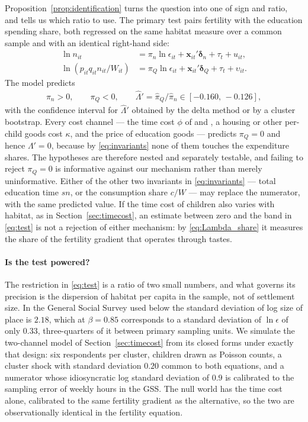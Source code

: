 \documentclass[11pt]{article}
\begin{document}
Proposition~\ref{prop:identification} turns the question into one of sign and ratio, and tells us
which ratio to use. The primary test pairs fertility with the education spending share, both
regressed on the same habitat measure over a common sample and with an identical right-hand side:
\begin{align}
\ln n_{it} &= \pi_n \ln \epsilon_{it} + \mathbf{x}_{it}'\boldsymbol{\delta}_n+\tau_t+u_{it},
\label{eq:pair_n}\\
\ln\!\left(p_{it}q_{it}n_{it}/W_{it}\right) &= \pi_{Q}\ln \epsilon_{it}
  + \mathbf{x}_{it}'\boldsymbol{\delta}_{Q}+\tau_t+\upsilon_{it}.
\label{eq:pair_q}
\end{align}
The model predicts
\begin{align}
\pi_n>0,
\qquad
\pi_{Q}<0,
\qquad
\widehat\Lambda'=\hat\pi_{Q}/\hat\pi_n\in[-0.160,\,-0.126],
\label{eq:test}
\end{align}
with the confidence interval for $\widehat\Lambda'$ obtained by the delta method or by a cluster
bootstrap. Every cost channel --- the time cost $\phi$ of \citet{DELACROIX2012271} and
\citet{dao25}, a housing or other per-child goods cost $\kappa$, and the price of education goods
--- predicts $\pi_{Q}=0$ and hence $\Lambda'=0$, because by \eqref{eq:invariants} none of them
touches the expenditure shares. The hypotheses are therefore nested and separately testable, and
failing to reject $\pi_{Q}=0$ is informative against our mechanism rather than merely
uninformative. Either of the other two invariants in \eqref{eq:invariants} --- total education time
$sn$, or the consumption share $c/W$ --- may replace the numerator, with the same predicted value.
If the time cost of children also varies with habitat, as in Section~\ref{sec:timecost}, an
estimate between zero and the band in \eqref{eq:test} is not a rejection of either mechanism: by
\eqref{eq:Lambda_share} it measures the share of the fertility gradient that operates through
tastes.

\paragraph{Is the test powered?}
The restriction in \eqref{eq:test} is a ratio of two small numbers, and what governs its precision
is the dispersion of habitat per capita in the sample, not of settlement size. In the General
Social Survey used below the standard deviation of log size of place is $2.18$, which at
$\beta=0.85$ corresponds to a standard deviation of $\ln\epsilon$ of only $0.33$, three-quarters of
it between primary sampling units. We simulate the two-channel model of
Section~\ref{sec:timecost} from its closed forms under exactly that design: six respondents per
cluster, children drawn as Poisson counts, a cluster shock with standard deviation $0.20$ common to
both equations, and a numerator whose idiosyncratic log standard deviation of $0.9$ is calibrated
to the sampling error of weekly hours in the GSS. The null world has the time cost alone,
calibrated to the same fertility gradient as the alternative, so the two are observationally
identical in the fertility equation.
\end{document}
